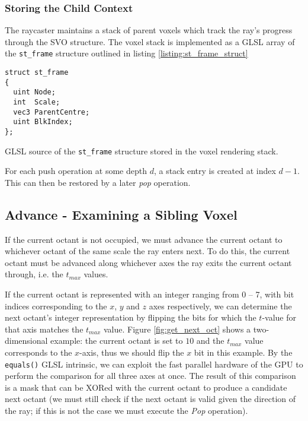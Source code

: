 \subsubsection{Storing the Child Context}
The raycaster maintains a stack of parent voxels which track the ray's progress through the SVO structure. The voxel stack is implemented as a GLSL array of the \texttt{st\_frame} structure outlined in listing \ref{listing:st_frame_struct}

\begin{listing}[ht]
\small
\linespread{0.80}
\selectfont
\begin{verbatim}
struct st_frame
{
  uint Node;
  int  Scale;
  vec3 ParentCentre;
  uint BlkIndex;
};
\end{verbatim}
\caption{GLSL source of the \texttt{st\_frame} structure stored in the voxel rendering stack.}
\label{listing:st_frame_struct}
\end{listing}

For each push operation at some depth $d$, a stack entry is created at index $d - 1$. This can then be restored by a later \textit{pop} operation.

\clearpage
\subsection{Advance - Examining a Sibling Voxel}

If the current octant is not occupied, we must advance the current octant to whichever octant of the same scale the ray enters next. To do this, the current octant must be advanced along whichever axes the ray exits the current octant through, i.e. the $t_{max}$ values.

If the current octant is represented with an integer ranging from 0 -- 7, with bit indices corresponding to the $x$, $y$ and $z$ axes respectively, we can determine the next octant's integer representation by flipping the bits for which the $t$-value for that axis matches the $t_{max}$ value. Figure \ref{fig:get_next_oct} shows a two-dimensional example: the current octant is set to $10$ and the $t_{max}$ value corresponds to the $x$-axis, thus we should flip the $x$ bit in this example. By the \texttt{equals()} GLSL intrinsic, we can exploit the fast parallel hardware of the GPU to perform the comparison for all three axes at once. The result of this comparison is a mask that can be XORed with the current octant to produce a candidate next octant (we must still check if the next octant is valid given the direction of the ray; if this is not the case we must execute the \textit{Pop} operation).

